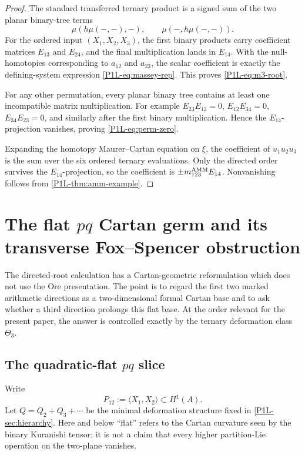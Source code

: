 \documentclass[11pt]{article}
\theoremstyle{remark}
\begin{document}
\begin{proof}
The standard transferred ternary product is a signed sum of the two planar binary-tree terms
\[
 \mu(h\mu(-,-),-),
 \qquad
 \mu(-,h\mu(-,-)).
\]
For the ordered input \((X_1,X_2,X_3)\), the first binary products carry coefficient matrices \(E_{13}\) and \(E_{24}\), and the final multiplication lands in \(E_{14}\).  With the null-homotopies corresponding to \(a_{12}\) and \(a_{23}\), the scalar coefficient is exactly the defining-system expression \eqref{P1L-eq:massey-rep}.  This proves \eqref{P1L-eq:m3-root}.

For any other permutation, every planar binary tree contains at least one incompatible matrix multiplication.  For example \(E_{23}E_{12}=0\), \(E_{12}E_{34}=0\), \(E_{34}E_{23}=0\), and similarly after the first binary multiplication.  Hence the \(E_{14}\)-projection vanishes, proving \eqref{P1L-eq:perm-zero}.

Expanding the homotopy Maurer--Cartan equation on \(\xi\), the coefficient of \(u_1u_2u_3\) is the sum over the six ordered ternary evaluations.  Only the directed order survives the \(E_{14}\)-projection, so the coefficient is \(\pm m_{123}^{\rm AMM}E_{14}\).  Nonvanishing follows from \cref{P1L-thm:amm-example}.
\end{proof}

\section{The flat \texorpdfstring{\(pq\)}{pq} Cartan germ and its transverse Fox--Spencer obstruction}
\label{P1L-sec:pq-cartan-spencer}

The directed-root calculation has a Cartan-geometric reformulation which does
not use the Ore presentation.  The point is to regard the first two marked
arithmetic directions as a two-dimensional formal Cartan base and to ask
whether a third direction prolongs this flat base.  At the order relevant for
the present paper, the answer is controlled exactly by the ternary deformation
class \(\Theta_3\).

\subsection{The quadratic-flat \texorpdfstring{\(pq\)}{pq} slice}

Write
\[
 P_{12}:=\langle X_1,X_2\rangle\subset H^1(A).
\]
Let \(Q=Q_2+Q_3+\cdots\) be the minimal deformation structure fixed in
\cref{P1L-sec:hierarchy}.  Here and below ``flat'' refers to the Cartan curvature
seen by the binary Kuranishi tensor; it is not a claim that every higher
partition-Lie operation on the two-plane vanishes.
\end{document}
